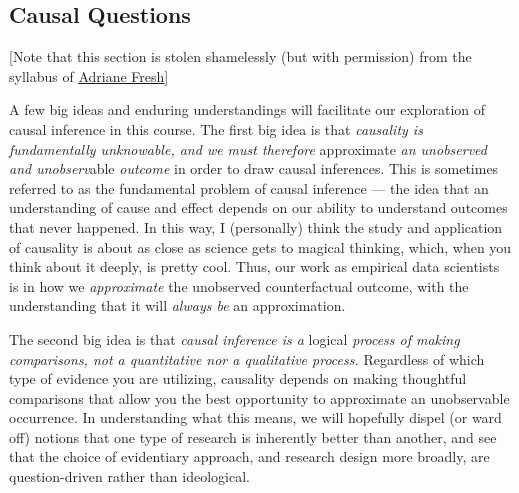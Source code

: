 \documentclass[12pt]{article}
\begin{document}
\subsection{Causal Questions}

[Note that this section is stolen shamelessly (but with permission) from the syllabus of \href{http://www.adrianefresh.com}{\underline{Adriane Fresh}}]

A few big ideas and enduring understandings will facilitate our exploration of causal inference in this course.  The first big idea is that \emph{causality is fundamentally unknowable, and we must therefore} approximate \emph{an unobserved and unobserv}able \emph{outcome} in order to draw causal inferences.  This is sometimes referred to as the fundamental problem of causal inference --- the idea that an understanding of cause and effect depends on our ability to understand outcomes that never happened.  In this way, I (personally) think the study and application of causality is about as close as science gets to magical thinking, which, when you think about it deeply, is pretty cool.  Thus, our work as empirical data scientists is in how we \emph{approximate} the unobserved counterfactual outcome, with the understanding that it will \emph{always be} an approximation.

The second big idea is that \emph{causal inference is a} logical \emph{process of making comparisons, not a quantitative nor a qualitative process.}  Regardless of which type of evidence you are utilizing, causality depends on making thoughtful comparisons that allow you the best opportunity to approximate an unobservable occurrence.  In understanding what this means, we will hopefully dispel (or ward off) notions that one type of research is inherently better than another, and see that the choice of evidentiary approach, and research design more broadly, are question-driven rather than ideological.
\end{document}
